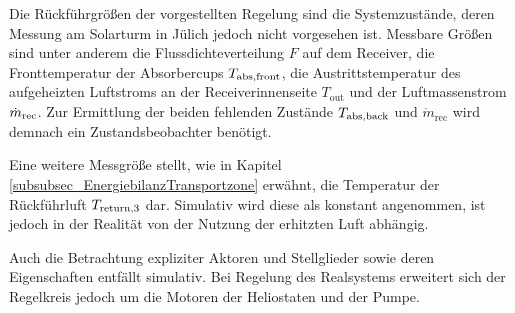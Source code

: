Die Rückführgrößen der vorgestellten Regelung sind die Systemzustände, deren Messung am Solarturm in Jülich jedoch nicht vorgesehen ist.
Messbare Größen sind unter anderem die Flussdichteverteilung $F$ auf dem Receiver, die Fronttemperatur der Absorbercups $T_{\mathrm{abs,front}}$, die Austrittstemperatur des aufgeheizten Luftstroms an der Receiverinnenseite $T_{\mathrm{out}}$ und der Luftmassenstrom $\dot{m}_{\mathrm{rec}}$.
Zur Ermittlung der beiden fehlenden Zustände $T_{\mathrm{abs,back}}$ und $\ddot{m}_{\mathrm{rec}}$ wird demnach ein Zustandsbeobachter benötigt.

Eine weitere Messgröße stellt, wie in Kapitel \ref{subsubsec_EnergiebilanzTransportzone} erwähnt, die Temperatur der Rückführluft $T_{\mathrm{return,}3}$ dar.
Simulativ wird diese als konstant angenommen, ist jedoch in der Realität von der Nutzung der erhitzten Luft abhängig.

Auch die Betrachtung expliziter Aktoren und Stellglieder sowie deren Eigenschaften entfällt simulativ.
Bei Regelung des Realsystems erweitert sich der Regelkreis jedoch um die Motoren der Heliostaten und der Pumpe.
